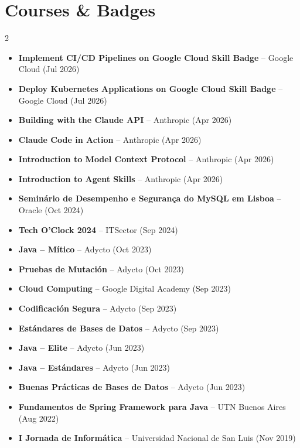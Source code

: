 \documentclass[10pt, a4paper]{article}
\begin{document}
\section{Courses \& Badges}
\begin{multicols}{2}
\begin{itemize}[leftmargin=10pt, itemsep=3pt, parsep=0pt, topsep=2pt]
    \item \textbf{Implement CI/CD Pipelines on Google Cloud Skill Badge} -- Google Cloud (Jul 2026)
    \item \textbf{Deploy Kubernetes Applications on Google Cloud Skill Badge} -- Google Cloud (Jul 2026)
    \item \textbf{Building with the Claude API} -- Anthropic (Apr 2026)
    \item \textbf{Claude Code in Action} -- Anthropic (Apr 2026)
    \item \textbf{Introduction to Model Context Protocol} -- Anthropic (Apr 2026)
    \item \textbf{Introduction to Agent Skills} -- Anthropic (Apr 2026)
    \item \textbf{Seminário de Desempenho e Segurança do MySQL em Lisboa} -- Oracle (Oct 2024)
    \item \textbf{Tech O'Clock 2024} -- ITSector (Sep 2024)
    \item \textbf{Java -- Mítico} -- Adycto (Oct 2023)
    \item \textbf{Pruebas de Mutación} -- Adycto (Oct 2023)
    \item \textbf{Cloud Computing} -- Google Digital Academy (Sep 2023)
    \item \textbf{Codificación Segura} -- Adycto (Sep 2023)
    \item \textbf{Estándares de Bases de Datos} -- Adycto (Sep 2023)
    \item \textbf{Java -- Elite} -- Adycto (Jun 2023)
    \item \textbf{Java -- Estándares} -- Adycto (Jun 2023)
    \item \textbf{Buenas Prácticas de Bases de Datos} -- Adycto (Jun 2023)
    \item \textbf{Fundamentos de Spring Framework para Java} -- UTN Buenos Aires (Aug 2022)
    \item \textbf{I Jornada de Informática} -- Universidad Nacional de San Luis (Nov 2019)
\end{itemize}
\end{multicols}

\end{document}
